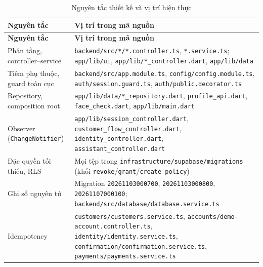 {\small
\begin{longtable}{>{\raggedright\arraybackslash}p{}>{\raggedright\arraybackslash}p{}}
\caption{Nguyên tắc thiết kế và vị trí hiện thực}\label{tab:ch2-principles-map}\\
\toprule
\textbf{Nguyên tắc} & \textbf{Vị trí trong mã nguồn} \\
\midrule
\endfirsthead
\toprule
\textbf{Nguyên tắc} & \textbf{Vị trí trong mã nguồn} \\
\midrule
\endhead
\bottomrule
\endfoot
Phân tầng, controller--service & \texttt{backend/\allowbreak{}src/\allowbreak{}*/\allowbreak{}*.\allowbreak{}controller.\allowbreak{}ts}, \texttt{*.\allowbreak{}service.\allowbreak{}ts}; \texttt{app/\allowbreak{}lib/\allowbreak{}ui}, \texttt{app/\allowbreak{}lib/\allowbreak{}*\_\allowbreak{}controller.\allowbreak{}dart}, \texttt{app/\allowbreak{}lib/\allowbreak{}data} \\
Tiêm phụ thuộc, guard toàn cục & \texttt{backend/\allowbreak{}src/\allowbreak{}app.\allowbreak{}module.\allowbreak{}ts}, \texttt{config/\allowbreak{}config.\allowbreak{}module.\allowbreak{}ts}, \texttt{auth/\allowbreak{}session.\allowbreak{}guard.\allowbreak{}ts}, \texttt{auth/\allowbreak{}public.\allowbreak{}decorator.\allowbreak{}ts} \\
Repository, composition root & \texttt{app/\allowbreak{}lib/\allowbreak{}data/\allowbreak{}*\_\allowbreak{}repository.\allowbreak{}dart}, \texttt{profile\_\allowbreak{}api.\allowbreak{}dart}, \texttt{face\_\allowbreak{}check.\allowbreak{}dart}, \texttt{app/\allowbreak{}lib/\allowbreak{}main.\allowbreak{}dart} \\
Observer (\texttt{Change\allowbreak{}Notifier}) & \texttt{app/\allowbreak{}lib/\allowbreak{}session\_\allowbreak{}controller.\allowbreak{}dart}, \texttt{customer\_\allowbreak{}flow\_\allowbreak{}controller.\allowbreak{}dart}, \texttt{identity\_\allowbreak{}controller.\allowbreak{}dart}, \texttt{assistant\_\allowbreak{}controller.\allowbreak{}dart} \\
Đặc quyền tối thiểu, RLS & Mọi tệp trong \texttt{infrastructure/\allowbreak{}supabase/\allowbreak{}migrations} (khối \texttt{revoke}/\texttt{grant}/\texttt{create policy}) \\
Ghi sổ nguyên tử & Migration \texttt{20261103000700}, \texttt{20261103000800}, \texttt{20261107000100}; \texttt{backend/\allowbreak{}src/\allowbreak{}database/\allowbreak{}database.\allowbreak{}service.\allowbreak{}ts} \\
Idempotency & \texttt{customers/\allowbreak{}customers.\allowbreak{}service.\allowbreak{}ts}, \texttt{accounts/\allowbreak{}demo-\allowbreak{}account.\allowbreak{}controller.\allowbreak{}ts}, \texttt{identity/\allowbreak{}identity.\allowbreak{}service.\allowbreak{}ts}, \texttt{confirmation/\allowbreak{}confirmation.\allowbreak{}service.\allowbreak{}ts}, \texttt{payments/\allowbreak{}payments.\allowbreak{}service.\allowbreak{}ts} \\

\end{longtable}}
